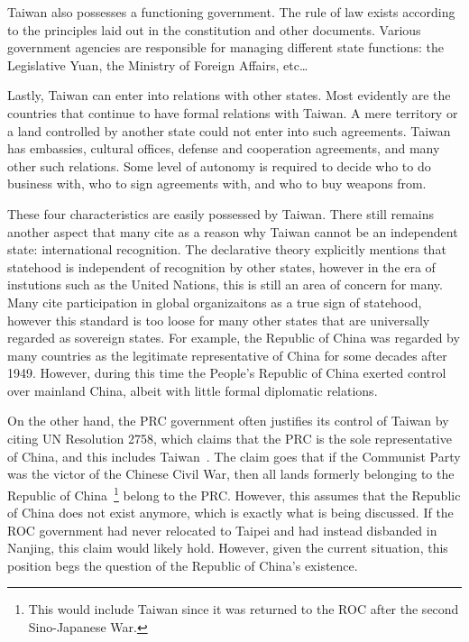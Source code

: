 \documentclass{article}
\begin{document}
Taiwan also possesses a functioning government. The rule of law exists according to the 
principles laid out in the constitution and other documents. Various government agencies
are responsible for managing different state functions: the Legislative Yuan, the Ministry
of Foreign Affairs, etc\dots

Lastly, Taiwan can enter into relations with other states. Most evidently are the countries
that continue to have formal relations with Taiwan. A mere territory or a land controlled
by another state could not enter into such agreements. Taiwan has embassies, cultural offices,
defense and cooperation agreements, and many other such relations. Some level of autonomy
is required to decide who to do business with, who to sign agreements with, and who to 
buy weapons from.

These four characteristics  are easily possessed by Taiwan. There still remains another 
aspect that many cite as a reason why Taiwan cannot be an independent state: international
recognition. The declarative theory explicitly mentions that statehood is independent of 
recognition by other states, however in the era of instutions such as the United Nations,
this is still an area of concern for many. Many cite participation in global organizaitons
as a true sign of statehood, however this standard is too loose for many other states that
are universally regarded as sovereign states. For example, the Republic of China was regarded by many countries
as the legitimate representative of China for some decades after 1949. However, during 
this time the People's Republic of China exerted control over mainland China, albeit with
little formal diplomatic relations.

On the other hand, the PRC government often justifies its control of Taiwan by citing 
UN Resolution 2758, which claims that the PRC is the sole representative of China, and 
this includes Taiwan~\cite{krasner2001problematic}. The claim goes that if the Communist Party was the victor of the 
Chinese Civil War, then all lands formerly belonging to the Republic of China~\footnote{This 
would include Taiwan since it was returned to the ROC after the second Sino-Japanese
War.} belong to the PRC\@. However, this assumes that the Republic of China does not exist
anymore, which is exactly what is being discussed. If the ROC government had never 
relocated to Taipei and had instead disbanded in Nanjing, this claim would likely 
hold. However, given the current situation, this position begs the question of the 
Republic of China's existence.
\end{document}
